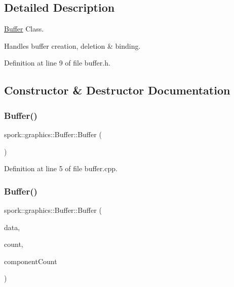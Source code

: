 \subsection{Detailed Description}
\hyperlink{classspork_1_1graphics_1_1_buffer}{Buffer} Class. 

Handles buffer creation, deletion \& binding. 

Definition at line 9 of file buffer.\+h.



\subsection{Constructor \& Destructor Documentation}
\mbox{\label{classspork_1_1graphics_1_1_buffer_a6b445479994088e19ca363f366c95d25}} 
\subsubsection{\texorpdfstring{Buffer()}{Buffer()}\hspace{0.1cm}{\footnotesize\ttfamily [1/2]}}
{\footnotesize\ttfamily spork\+::graphics\+::\+Buffer\+::\+Buffer (\begin{DoxyParamCaption}{ }\end{DoxyParamCaption})}



Definition at line 5 of file buffer.\+cpp.

\mbox{\label{classspork_1_1graphics_1_1_buffer_a743f6720ebcb279273203a29d8b7f0e9}} 
\subsubsection{\texorpdfstring{Buffer()}{Buffer()}\hspace{0.1cm}{\footnotesize\ttfamily [2/2]}}
{\footnotesize\ttfamily spork\+::graphics\+::\+Buffer\+::\+Buffer (\begin{DoxyParamCaption}\item[{G\+Lfloat $\ast$}]{data,  }\item[{G\+Lsizei}]{count,  }\item[{G\+Luint}]{component\+Count }\end{DoxyParamCaption})}



